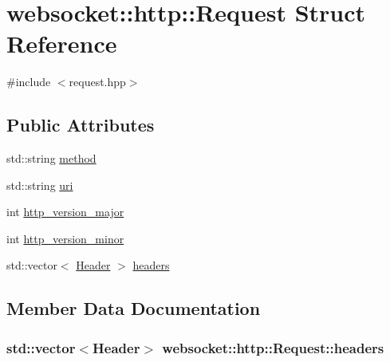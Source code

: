 \hypertarget{structwebsocket_1_1http_1_1Request}{}\section{websocket\+:\+:http\+:\+:Request Struct Reference}
\label{structwebsocket_1_1http_1_1Request}


{\ttfamily \#include $<$request.\+hpp$>$}

\subsection*{Public Attributes}
\begin{DoxyCompactItemize}
\item 
std\+::string \hyperlink{structwebsocket_1_1http_1_1Request_a698538be27d0b18b59c5caf1a0e3d495}{method}
\item 
std\+::string \hyperlink{structwebsocket_1_1http_1_1Request_a32fdc3e7be509b14c80a069dfbcf3b86}{uri}
\item 
int \hyperlink{structwebsocket_1_1http_1_1Request_a425abfd24de736ada49b1ac904316fa8}{http\+\_\+version\+\_\+major}
\item 
int \hyperlink{structwebsocket_1_1http_1_1Request_adc822c62d63286a9127d04d7d890148b}{http\+\_\+version\+\_\+minor}
\item 
std\+::vector$<$ \hyperlink{structwebsocket_1_1http_1_1Header}{Header} $>$ \hyperlink{structwebsocket_1_1http_1_1Request_a535de60f064cc2ff1a2ae5cce352b9d8}{headers}
\end{DoxyCompactItemize}


\subsection{Member Data Documentation}
\subsubsection[{\texorpdfstring{headers}{headers}}]{\setlength{\rightskip}{0pt plus 5cm}std\+::vector$<${\bf Header}$>$ websocket\+::http\+::\+Request\+::headers}\hypertarget{structwebsocket_1_1http_1_1Request_a535de60f064cc2ff1a2ae5cce352b9d8}{}\label{structwebsocket_1_1http_1_1Request_a535de60f064cc2ff1a2ae5cce352b9d8}
